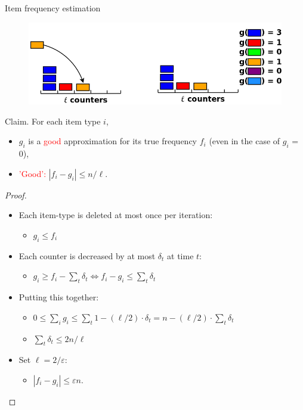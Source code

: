 \documentclass[first=dgreen,second=purple,logo=redque]{aaltoslides}
\begin{document}
\begin{frame}[allowframebreaks=1]{Item frequency estimation}
\framebreak

\begin{figure}
  \includegraphics[scale=0.3]{plots/fi6}
 \label{fig:fi5}
\end{figure}

\textcolor{dgreen}{Claim.} 
For each item type $i$,
\begin{itemize}
	\item $g_{i}$ is a \textcolor{red}{good} approximation for its
  true frequency $f_{i}$ (even in the case of $g_{i}$ = 0),
	\item \textcolor{red}{'Good':} $|f_{i} - g_{i} | \leq n/\ell$.
\end{itemize}         

\framebreak

\begin{proof}
\begin{itemize}
	\item Each item-type is deleted \textcolor{dgreen}{at most} once per iteration:
		\begin{itemize}\item $g_{i} \leq f_{i}$\end{itemize}
	\item Each counter is decreased by at most $\delta_{t}$ at time $t$:
		\begin{itemize}\item $g_{i} \geq f_{i} - \sum_{t} \delta_{t} \Leftrightarrow f_{i} - g_{i} \leq \sum_{t} \delta_{t}$\end{itemize}
	\item Putting this together:
		\begin{itemize}
			\item $0 \leq \sum_{i}g_{i} \leq \sum_{t} 1 - (\ell/2)
				\cdot \delta_{t} = n - (\ell/2) \cdot \sum_{t} \delta_{t}$
			\item $\sum_{t} \delta_{t} \leq 2n/\ell$
		\end{itemize}
	\item Set $\ell = 2/\varepsilon$:
		\begin{itemize}\item $|f_{i} - g_{i}| \leq \varepsilon n$.\end{itemize}
\end{itemize}
\end{proof}


\end{frame}
\end{document}
